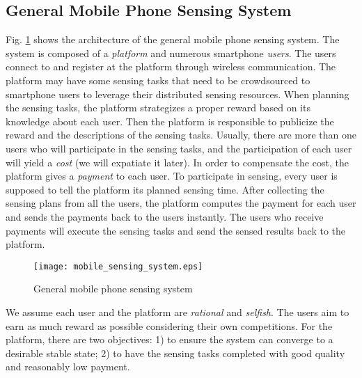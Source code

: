 \documentclass{IEEEtran}
\begin{document}
\subsection{General Mobile Phone Sensing System}
Fig. \ref{fig:mobile_sensing_system} shows the architecture of the general mobile phone sensing system. The system is composed of a \emph{platform} and numerous smartphone \emph{users}. The users connect to and register at the platform through wireless communication. The platform may have some sensing tasks that need to be crowdsourced to smartphone users to leverage their distributed sensing resources.
When planning the sensing tasks, the platform strategizes a proper reward based on its knowledge about each user. Then the platform is responsible to publicize the reward and the descriptions of the sensing tasks. Usually, there are more than one users who will participate in the sensing tasks, and the participation of each user will yield a \emph{cost} (we will expatiate it later). In order to compensate the cost, the platform gives a \emph{payment} to each user. %
To participate in sensing, every user is supposed to tell the platform its planned sensing time. After collecting the sensing plans from all the users, the platform computes the payment for each user and sends the payments back to the users instantly. The users who receive payments will execute the sensing tasks and send the sensed results back to the platform. %

\begin{figure}[!t]
\centering{}
\texttt{[image: mobile\_sensing\_system.eps]}
\caption{General mobile phone sensing system}
\label{fig:mobile_sensing_system}
\end{figure}

We assume each user and the platform are \emph{rational} and \emph{selfish}. %
The users aim to earn as much reward as possible considering their own competitions.
For the platform, there are two objectives: 1) to ensure the system can converge to a desirable stable state; 2) to have the sensing tasks completed with good quality and reasonably low payment. 
\end{document}
